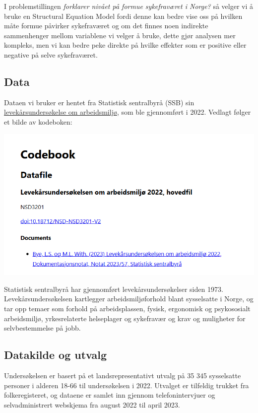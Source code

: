 \documentclass[
  12pt,
  a4paper,
  DIV=11,
  numbers=noendperiod]{scrartcl}
\begin{document}
I problemstillingen \emph{forklarer nivået på formue sykefraværet i
Norge?} så velger vi å bruke en Structural Equation Model fordi denne
kan bedre vise oss på hvilken måte formue påvirker sykefraværet og om
det finnes noen indirekte sammenhenger mellom variablene vi velger å
bruke, dette gjør analysen mer kompleks, men vi kan bedre peke direkte
på hvilke effekter som er positive eller negative på selve sykefraværet.

\subsection{Data}\label{data}

Dataen vi bruker er hentet fra Statistisk sentralbyrå (SSB) sin
\href{https://www.ssb.no/arbeid-og-lonn/arbeidsmiljo-sykefravaer-og-arbeidskonflikter/artikler/levekarsundersokelsen-om-arbeidsmiljo-2022}{levekårsundersøkelse
om arbeidsmiljø}, som ble gjennomført i 2022. Vedlagt følger et bilde av
kodeboken:

\includegraphics{dokumentobjekter/bilder/codebook.png}

Statistisk sentralbyrå har gjennomført levekårsundersøkelser siden 1973.
Levekårsundersøkelsen kartlegger arbeidsmiljøforhold blant sysselsatte i
Norge, og tar opp temaer som forhold på arbeidsplassen, fysisk,
ergonomisk og psykososialt arbeidsmiljø, yrkesrelaterte helseplager og
sykefravær og krav og muligheter for selvbestemmelse på jobb.

\subsection{Datakilde og utvalg}\label{datakilde-og-utvalg}

Undersøkelsen er basert på et landsrepresentativt utvalg på 35 345
sysselsatte personer i alderen 18-66 til undersøkelsen i 2022. Utvalget
er tilfeldig trukket fra folkeregisteret, og dataene er samlet inn
gjennom telefonintervjuer og selvadministrert webskjema fra august 2022
til april 2023.
\end{document}
